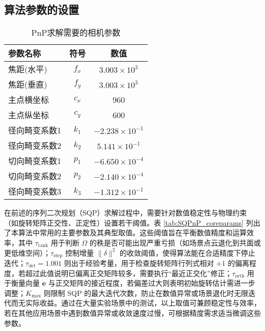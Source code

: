 \subsection{算法参数的设置}
\begin{table}[htbp]
	\centering
	\caption{PnP求解需要的相机参数}
	\label{tab:camera_params_solvepnp}
	\begin{tabular}{lcc}
		\toprule
		\textbf{参数名称} & \textbf{符号} & \textbf{数值} \\
		\midrule
		焦距(水平) & $f_x$ & \(3.003\times10^{3}\) \\
		焦距(垂直) & $f_y$ & \(3.003\times10^{3}\) \\
		主点横坐标 & $c_x$ & 960 \\
		主点纵坐标 & $c_y$ & 600 \\
		径向畸变系数1 & $k_1$ & \(-2.238\times10^{-1}\) \\
		径向畸变系数2 & $k_2$ & \(5.141\times10^{-1}\) \\
		切向畸变系数1 & $p_1$ & \(-6.650\times10^{-4}\) \\
		切向畸变系数2 & $p_2$ & \(-2.140\times10^{-4}\) \\
		径向畸变系数3 & $k_3$ & \(-1.312\times10^{-1}\) \\
		\bottomrule
	\end{tabular}
\end{table}




在前述的序列二次规划（SQP）求解过程中，需要针对数值稳定性与物理约束（如旋转矩阵正交性、正定性）设置若干阈值。表 \ref{tab:SQPnP_coreparams} 列出了本算法中常用的主要参数及其典型取值。这些阈值旨在平衡数值精度和运算效率，其中 \(\tau_{\mathrm{rank}}\) 用于判断 \(\Omega\) 的秩是否可能出现严重亏损（如场景点云退化到共面或更低维空间）；\(\tau_{\mathrm{step}}\) 控制增量 \(\|\delta\|^2\) 的收敛阈值，使得算法能在合适精度下停止迭代；\(\tau_{\det}=1.001\) 则出于经验考量，用于检查旋转矩阵行列式相对 \(+1\) 的偏离程度，若超过此值说明已偏离正交矩阵较多，需要执行“最近正交化”修正；\(\tau_{\mathrm{orth}}\) 用于衡量向量 \(\mathbf{e}\) 与正交矩阵的接近程度，若偏差过大则表明初始旋转估计需进一步调整；\(K_{\max}\) 则限制 SQP 的最大迭代次数，防止在数值异常或场景退化时无限迭代而无实际收益。通过在大量实验场景中的测试，以上取值可兼顾稳定性与效率，若在其他应用场景中遇到数值异常或收敛速度过慢，可根据精度需求适当微调这些参数。

